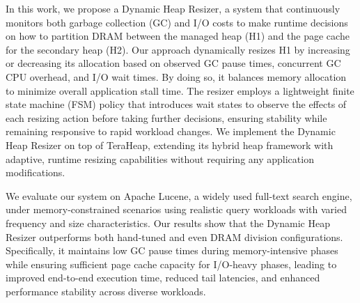 In this work, we propose a Dynamic Heap Resizer, a system that continuously
monitors both garbage collection (GC) and I/O costs to make runtime decisions on
how to partition DRAM between the managed heap (H1) and the page cache for the
secondary heap (H2). Our approach dynamically resizes H1 by increasing or
decreasing its allocation based on observed GC pause times, concurrent GC CPU
overhead, and I/O wait times. By doing so, it balances memory allocation to
minimize overall application stall time. The resizer employs a lightweight
finite state machine (FSM) policy that introduces wait states to observe the
effects of each resizing action before taking further decisions, ensuring
stability while remaining responsive to rapid workload changes. We implement the
Dynamic Heap Resizer on top of TeraHeap, extending its hybrid heap framework
with adaptive, runtime resizing capabilities without requiring any application
modifications.

We evaluate our system on Apache Lucene, a widely used full-text search engine,
under memory-constrained scenarios using realistic query workloads with varied
frequency and size characteristics. Our results show that the Dynamic Heap
Resizer outperforms both hand-tuned and even DRAM division configurations.
Specifically, it maintains low GC pause times during memory-intensive phases
while ensuring sufficient page cache capacity for I/O-heavy phases, leading to
improved end-to-end execution time, reduced tail latencies, and enhanced
performance stability across diverse workloads.
